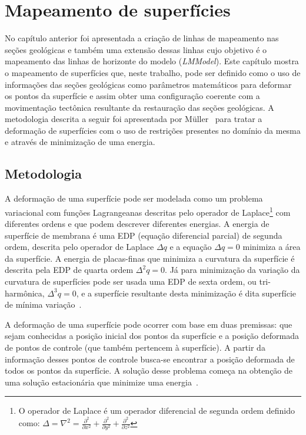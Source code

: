 
\chapter{Mapeamento de superfícies}

No capítulo anterior foi apresentada a criação de linhas de mapeamento nas seções geológicas e também uma extensão dessas linhas cujo objetivo é o mapeamento das linhas de horizonte do modelo (\emph{LMModel}). Este capítulo mostra o mapeamento de superfícies que, neste trabalho, pode ser definido como o uso de informações das seções geológicas como parâmetros matemáticos para deformar os pontos da superfície e assim obter uma configuração coerente com a movimentação tectônica resultante da restauração das seções geológicas. A metodologia descrita a seguir foi apresentada por Müller~\cite{Muller} para tratar a deformação de superfícies com o uso de restrições presentes no domínio da mesma e através de minimização de uma energia.

\section{Metodologia}\label{surface-mapping-metodology}

A deformação de uma superfície pode ser modelada como um problema variacional com funções Lagrangeanas descritas pelo operador de Laplace\footnote{O operador de Laplace é um operador diferencial de segunda ordem definido como: $\Delta=\nabla^2=\frac{\partial^2}{\partial x^2}+\frac{\partial^2}{\partial y^2}+\frac{\partial^2}{\partial z^2}$} com diferentes ordens e que podem descrever diferentes energias. A energia de superfície de membrana é uma EDP (equação diferencial parcial) de segunda ordem, descrita pelo operador de Laplace $\Delta{q}$ e a equação $\Delta{q}=0$ minimiza a área da superfície. A energia de placas-finas que minimiza a curvatura da superfície é descrita pela EDP de quarta ordem $\Delta^2{q}=0$. Já para minimização da variação da curvatura de superfícies pode ser usada uma EDP de sexta ordem, ou tri-harmônica, $\Delta^3{q}=0$, e a superfície resultante desta minimização é dita superfície de mínima variação~\cite{Muller, Botsch}.

A deformação de uma superfície pode ocorrer com base em duas premissas: que sejam conhecidas a posição inicial dos pontos da superfície e a posição deformada de pontos de controle (que também pertencem à superfície). A partir da informação desses pontos de controle busca-se encontrar a posição deformada de todos os pontos da superfície. A solução desse problema começa na obtenção de uma solução estacionária que minimize uma energia~\cite{Muller}.

